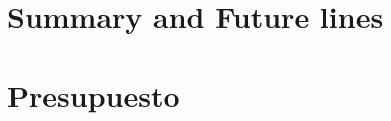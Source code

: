 \documentclass[spanish,a4paper,12pt,oneside]{extreport}
\begin{document}
\chapter{Summary and Future lines}
\label{chapter:ingles}



\newpage{\pagestyle{empty}}
\thispagestyle{empty}

\chapter{Presupuesto}
\label{chapter:presupuesto}







\nocite{*}

\end{document}
